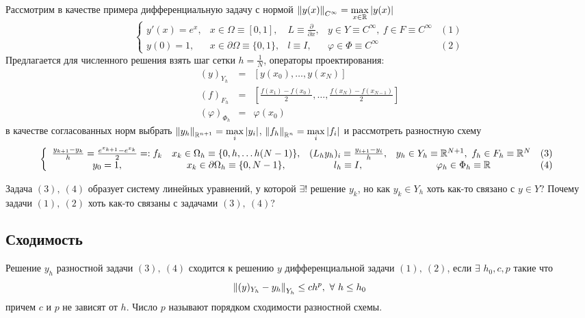\begin{example}
  Рассмотрим в качестве примера дифференциальную задачу с нормой $\left\lVert y(x)\right\rVert_{C^{\infty}}=\max\limits_{x\in\mathbb{R}}\left\lvert y(x)\right\rvert$
  \[\left\{\begin{array}{ccccc}
      y'(x)=e^x, & x\in\Omega\equiv[0,1],           & L \equiv \frac{\partial}{\partial x}, & y\in Y\equiv C^{\infty},\ f\in F\equiv C^{\infty} & (1) \\
      y(0)=1,    & x\in\partial\Omega\equiv\{0,1\}, & l \equiv I,                           & \varphi\in\Phi\equiv C^{\infty}                   & (2)
    \end{array}\right.\]
  Предлагается для численного решения взять шаг сетки $h=\frac{1}{N}$,
  операторы проектирования:
  \[\begin{array}{ccc}
      (y)_{Y_h}          & = & [y(x_0),\ldots,y(x_N)]                                       \\
      (f)_{F_h}          & = & [\frac{f(x_1)-f(x_0)}{2},\ldots,\frac{f(x_N)-f(x_{N-1})}{2}] \\
      (\varphi)_{\Phi_h} & = & \varphi(x_0)
    \end{array}\]
  в качестве согласованных норм
  выбрать $\left\lVert y_h\right\rVert_{\mathbb{R}^{n+1}}=\max\limits_{i}|y_i|$, $\left\lVert f_h\right\rVert_{\mathbb{R}^{n}}=\max\limits_{i}|f_i|$ и рассмотреть разностную схему
  \[\left\{\begin{array}{cccccc}
      \frac{y_{k+1}-y_{k}}{h}=\frac{e^{x_{k+1}}-e^{x_k}}{2}=:f_k & x_k\in\Omega_h\equiv\{0,h,\ldots h(N-1)\}, & (L_hy_h)_i \equiv \frac{y_{i+1}-y_i}{h}, & y_h\in Y_h\equiv \mathbb{R}^{N+1},\ f_h\in F_h\equiv \mathbb{R}^{N} & (3) \\
      y_0=1,                                                     & x_k\in\partial\Omega_h\equiv\{0,N-1\},     & l_h \equiv I,                            & \varphi_h\in\Phi_h\equiv \mathbb{R}                         & (4)
    \end{array}\right.\]
\end{example}

Задача $(3),\ (4)$ образует систему линейных уравнений, у которой $\exists!$ решение $y_k$,
но как $y_k\in Y_h$ хоть как-то связано с $y\in Y$? Почему задачи $(1),\ (2)$ хоть как-то связаны с задачами $(3),\ (4)$?

\subsection*{Сходимость}

\begin{definition}
  Решение $y_h$ разностной задачи $(3),\ (4)$ сходится к
  решению $y$ дифференциальной задачи $(1),\ (2)$,
  если $\exists$ $h_0,c,p$ такие что
  \[\left\lVert(y)_{Y_h}-y_h \right\rVert_{Y_h} \leq ch^p,\ \forall\ h\leq h_0\]
  причем $c$ и $p$ не зависят от $h$. Число $p$ называют порядком сходимости
  разностной схемы.
\end{definition}

